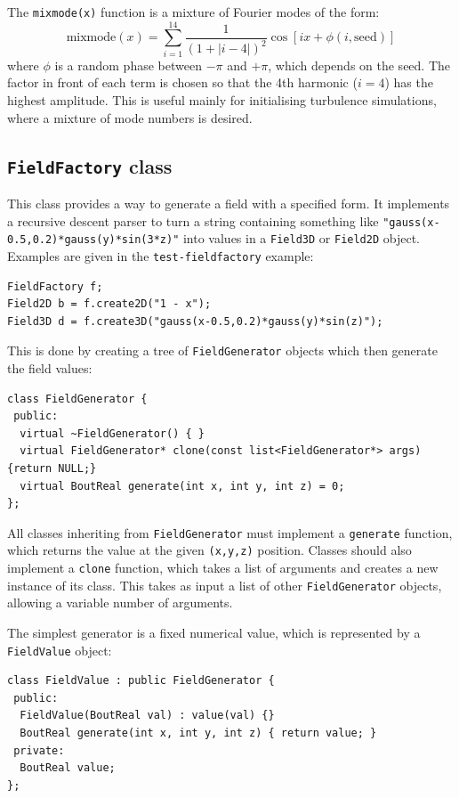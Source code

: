 \documentclass[12pt]{article}
\begin{document}
The \texttt{mixmode(x)} function is a mixture of Fourier modes of the form:
\[
\mathrm{mixmode}\left(x\right) = \sum_{i=1}^{14} \frac{1}{\left(1 + \left|i-4\right|\right)^2}\cos\left[ix + \phi\left(i, \mathrm{seed}\right)\right]
\]
where $\phi$ is a random phase between $-\pi$ and $+\pi$, which depends on the seed. The factor in front of each term
is chosen so that the 4th harmonic ($i=4$) has the highest amplitude. This is useful mainly for initialising turbulence simulations,
where a mixture of mode numbers is desired.

\subsection{\texttt{FieldFactory} class}

This class provides a way to generate a field with a specified form. It implements
a recursive descent parser to turn a string containing something like
\lstinline!"gauss(x-0.5,0.2)*gauss(y)*sin(3*z)"! into values in a \lstinline!Field3D!
or \lstinline!Field2D! object. Examples are given in the \texttt{test-fieldfactory} example:
\begin{lstlisting}
FieldFactory f;
Field2D b = f.create2D("1 - x");
Field3D d = f.create3D("gauss(x-0.5,0.2)*gauss(y)*sin(z)");
\end{lstlisting}

This is done by creating a tree of \lstinline!FieldGenerator! objects
which then generate the field values: 
\begin{lstlisting}[firstnumber=49]
class FieldGenerator {
 public:
  virtual ~FieldGenerator() { }
  virtual FieldGenerator* clone(const list<FieldGenerator*> args) {return NULL;}
  virtual BoutReal generate(int x, int y, int z) = 0;
};
\end{lstlisting}
All classes inheriting from \lstinline!FieldGenerator! must implement a
\lstinline!generate! function, which returns the value
at the given \lstinline!(x,y,z)! position. Classes should also implement a
\lstinline!clone! function, which takes a list of arguments and creates a new
instance of its class. This takes as input a list of other \lstinline!FieldGenerator! objects,
allowing a variable number of arguments.

The simplest generator is a fixed numerical value, which is represented
by a \lstinline!FieldValue! object: 
\begin{lstlisting}[firstnumber=59]
class FieldValue : public FieldGenerator {
 public:
  FieldValue(BoutReal val) : value(val) {}
  BoutReal generate(int x, int y, int z) { return value; }
 private:
  BoutReal value;
};
\end{lstlisting}
\end{document}

